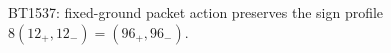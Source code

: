 \begin{center}\small
BT1537: fixed-ground packet action preserves the sign profile $8(12_+,12_-)=(96_+,96_-)$.
\end{center}
